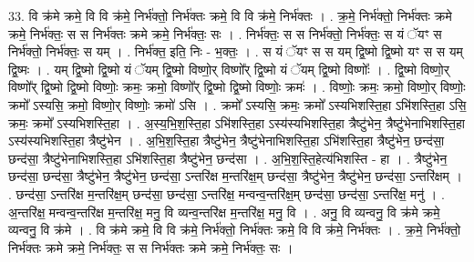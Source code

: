 \documentclass[17pt]{extarticle}
\begin{document}
33. वि क्र॑मे क्रमे॒ वि वि क्र॑मे॒ निर्भ॑क्तो॒ निर्भ॑क्तः क्रमे॒ वि वि क्र॑मे॒ निर्भ॑क्तः । . क्र॒मे॒ निर्भ॑क्तो॒ निर्भ॑क्तः क्रमे क्रमे॒ निर्भ॑क्तः॒ स स निर्भ॑क्तः क्रमे क्रमे॒ निर्भ॑क्तः॒ सः । . निर्भ॑क्तः॒ स स निर्भ॑क्तो॒ निर्भ॑क्तः॒ स यं ॅयꣳ स निर्भ॑क्तो॒ निर्भ॑क्तः॒ स यम् । . निर्भ॑क्त॒ इति॒ निः - भ॒क्तः॒ । . स यं ॅयꣳ स स यम् द्वि॒ष्मो द्वि॒ष्मो यꣳ स स यम् द्वि॒ष्मः । . यम् द्वि॒ष्मो द्वि॒ष्मो यं ॅयम् द्वि॒ष्मो विष्णो॒र् विष्णो᳚र् द्वि॒ष्मो यं ॅयम् द्वि॒ष्मो विष्णोः᳚ । . द्वि॒ष्मो विष्णो॒र् विष्णो᳚र् द्वि॒ष्मो द्वि॒ष्मो विष्णोः॒ क्रमः॒ क्रमो॒ विष्णो᳚र् द्वि॒ष्मो द्वि॒ष्मो विष्णोः॒ क्रमः॑ । . विष्णोः॒ क्रमः॒ क्रमो॒ विष्णो॒र् विष्णोः॒ क्रमो᳚ ऽस्यसि॒ क्रमो॒ विष्णो॒र् विष्णोः॒ क्रमो॑ ऽसि । . क्रमो᳚ ऽस्यसि॒ क्रमः॒ क्रमो᳚ ऽस्यभिशस्ति॒हा ऽभि॑शस्ति॒हा ऽसि॒ क्रमः॒ क्रमो᳚ ऽस्यभिशस्ति॒हा । . अ॒स्य॒भि॒श॒स्ति॒हा ऽभि॑शस्ति॒हा ऽस्य॑स्यभिशस्ति॒हा त्रैष्टु॑भेन॒ त्रैष्टु॑भेनाभिशस्ति॒हा ऽस्य॑स्यभिशस्ति॒हा त्रैष्टु॑भेन । . अ॒भि॒श॒स्ति॒हा त्रैष्टु॑भेन॒ त्रैष्टु॑भेनाभिशस्ति॒हा ऽभि॑शस्ति॒हा त्रैष्टु॑भेन॒ छन्द॑सा॒ छन्द॑सा॒ त्रैष्टु॑भेनाभिशस्ति॒हा ऽभि॑शस्ति॒हा त्रैष्टु॑भेन॒ छन्द॑सा । . अ॒भि॒श॒स्ति॒हेत्य॑भिशस्ति - हा । . त्रैष्टु॑भेन॒ छन्द॑सा॒ छन्द॑सा॒ त्रैष्टु॑भेन॒ त्रैष्टु॑भेन॒ छन्द॑सा॒ ऽन्तरि॑क्ष म॒न्तरि॑क्ष॒म् छन्द॑सा॒ त्रैष्टु॑भेन॒ त्रैष्टु॑भेन॒ छन्द॑सा॒ ऽन्तरि॑क्षम् । . छन्द॑सा॒ ऽन्तरि॑क्ष म॒न्तरि॑क्ष॒म् छन्द॑सा॒ छन्द॑सा॒ ऽन्तरि॑क्ष॒ मन्वन्व॒न्तरि॑क्ष॒म् छन्द॑सा॒ छन्द॑सा॒ ऽन्तरि॑क्ष॒ मनु॑ । . अ॒न्तरि॑क्ष॒ मन्वन्व॒न्तरि॑क्ष म॒न्तरि॑क्ष॒ मनु॒ वि व्यन्व॒न्तरि॑क्ष म॒न्तरि॑क्ष॒ मनु॒ वि । . अनु॒ वि व्यन्वनु॒ वि क्र॑मे क्रमे॒ व्यन्वनु॒ वि क्र॑मे । . वि क्र॑मे क्रमे॒ वि वि क्र॑मे॒ निर्भ॑क्तो॒ निर्भ॑क्तः क्रमे॒ वि वि क्र॑मे॒ निर्भ॑क्तः । . क्र॒मे॒ निर्भ॑क्तो॒ निर्भ॑क्तः क्रमे क्रमे॒ निर्भ॑क्तः॒ स स निर्भ॑क्तः क्रमे क्रमे॒ निर्भ॑क्तः॒ सः । \newline
\end{document}
